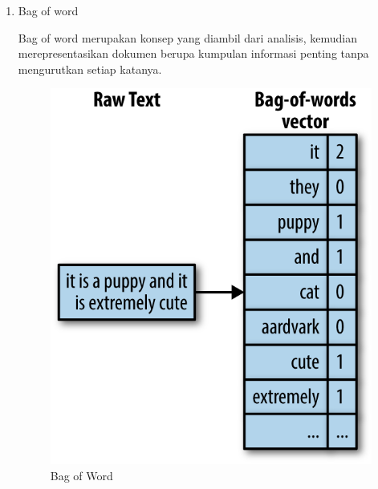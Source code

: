 \begin{enumerate}
\item Bag of word
\par Bag of word merupakan konsep yang diambil dari analisis, kemudian merepresentasikan dokumen berupa kumpulan informasi penting tanpa mengurutkan setiap katanya.
\begin{figure}[ht]
\centering
\includegraphics[scale=0.5]{figures/ch4/5.png}
\caption{Bag of Word}
\label{Contoh Ilustrasi}
\end{figure}
	

\end{enumerate}

